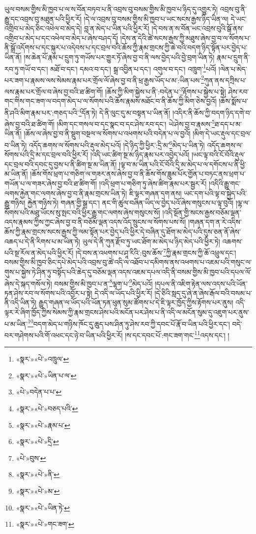 ཡུལ་བསམ་གྱིས་མི་ཁྱབ་པ་ལ་ས་བོན་བཏབ་པ་ནི་འབྲས་བུ་བསམ་གྱིས་མི་ཁྱབ་པ་ཉིད་དུ་འགྱུར་ཏེ། འབྲས་བུ་ནི་རྒྱུ་དང་འབྲས་བུ་མཐུན་པའི་ཕྱིར་རོ། །དེ་ལ་འབྲས་བུ་བསམ་གྱིས་མི་ཁྱབ་པ་ཡང་སངས་རྒྱས་ཉིད་ཡིན་ལ། དེ་ཡང་འགྲིབ་པ་མེད་ཅིང་འཕེལ་བ་མེད་དེ། བླ་ན་མེད་པ་ཡིན་པའི་ཕྱིར་རོ། །དེ་བས་ན་ས་བོན་ཡང་འབྲས་བུའི་སྒོ་ནས་འགྲིབ་པ་མེད་པ་དང་འཕེལ་བ་མེད་པ་ཞེས་བཤད་དོ། །དེས་ན་དེའི་ཚེ་སངས་རྒྱས་ཀྱི་མཐུས་ཞེས་བྱ་བ་ལ་སོགས་པ་ནི་སྒྲོ་འདོགས་པ་དང་སྐུར་པ་འདེབས་པ་དང་བྲལ་བའི་ཆོས་ཀྱི་རྣམ་གྲངས་ཀྱི་ཆེ་བའི་བདག་ཉིད་སྟོན་པར་བྱེད་པ་ཡིན་ནོ། །ས་ཆེན་པོ་རྣམ་པ་དྲུག་ཏུ་གཡོས་པར་གྱུར་ཏོ་ཞེས་བྱ་བ་ནི་ལས་བྱེད་པའི་བྱེ་བྲག་ཡིན་ཏེ། རྣམ་པ་དྲུག་ནི་རབ་ཏུ་གཡོ་བ་དང་། མཐོ་བ་དང་། དམའ་བ་དང་། སྒྲ་འབྱིན་པ་དང་། འགུལ་བ་དང་། འཁྲུག་\footnote{«སྣར་»«པེ་»འཁྲུལ་}པའོ། །ལེན་པ་མེད་པར་ཟག་པ་རྣམས་ལས་སེམས་རྣམ་པར་གྲོལ་ལོ་ཞེས་བྱ་བ་ནི་ཕྲ་རྒྱས་ཡོད་པ་མ་:ཡིན་པས་\footnote{«སྣར་»«པེ་»ཡིན་པ་ལ་}ཀུན་ནས་དཀྲིས་པ་ལས་རྣམ་པར་གྲོལ་བ་ཞེས་བྱ་བའི་ཐ་ཚིག་གོ། །ཆོས་ཀྱི་མིག་སྐྱེས་པ་ནི་:བདེན་པ་\footnote{«པེ་»བདེན་པ་པ་}རྟོགས་པ་སྐྱེས་པ་སྟེ། ཤེས་རབ་གང་གིས་གང་ཟག་ལ་བདག་མེད་པ་ལ་སོགས་པའི་ཆོས་རྣམས་མཐོང་བ་ནི་ཆོས་ཀྱི་མིག་ཅེས་བྱའོ། །ཆོས་སྨོས་པ་ནི་ཤའི་མིག་རྣམ་པར་:གཅད་པའི་\footnote{«སྣར་»«པེ་»བཅད་པའི་}དོན་ཏེ། དེ་ནི་ལུང་དུ་མ་བསྟན་པ་ཡིན་ནོ། །འདིར་ནི་ཆོས་ཀྱི་བདག་ཉིད་དགེ་བ་ཞེས་བྱ་བའི་ཐ་ཚིག་གོ། །མིག་དང་གསལ་བ་དང་སྣང་བ་དང་ཤེས་རབ་དང་། ཡེ་ཤེས་བྱ་བ་རྣམས་\footnote{«སྣར་»«པེ་»རྣམ་པ་}ཐ་དད་པ་མ་ཡིན་ནོ། །ཆོས་ལ་ཞེས་བྱ་བ་ནི་སྡུག་བསྔལ་ལ་སོགས་པ་འཕགས་པའི་བདེན་པ་ལ་བྱའོ། །མིག་དེ་ཡང་རྡུལ་དང་བྲལ་བ་ཡིན་ཏེ། འདོད་ཆགས་ལ་སོགས་པའི་རྡུལ་མེད་པའོ། །དེ་ཉིད་ཀྱི་ཕྱིར་:དྲི་མ་\footnote{«སྣར་»«པེ་»དྲི་}མེད་པ་ཡིན་ཏེ། འདོད་ཆགས་ལ་སོགས་པའི་དྲི་མ་དང་བྲལ་བའི་ཕྱིར་རོ། །འདི་ཡང་ཚིག་སྔ་མ་ཉིད་རྣམ་པར་འབྱེད་པའོ། །ཡང་ལྟ་བའི་ངོ་བོའི་རྡུལ་དང་བྲལ་བའི་དབང་དུ་བྱས་པ་ནི་ཚིག་སྔ་མ་ཡིན་ནོ། །ལྟ་བ་མ་ཡིན་པའི་ངོ་བོའི་དྲི་མ་མེད་པ་ལ་དགོངས་པ་ནི་ཕྱི་མ་ཡིན་ནོ། །ཆོས་གོས་ཕྲག་པ་གཅིག་ལ་གཟར་ནས་ཞེས་བྱ་བ་ནི་ཆོས་གོས་ཟླུམ་པོར་གྱོན་པ་བཏང་ནས་ཕྲག་པ་གཡོན་པ་ལ་གཟར་ཞེས་བྱ་བའི་ཐ་ཚིག་གོ། །འདི་ཕྲག་པ་གཅིག་ཏུ་ཞེས་ཚིག་རྣམ་པར་སྦྱར་རོ། །འདིའི་རྒྱུ་གང་ལགས་རྐྱེན་གང་ལགས་ཞེས་བྱ་བ་ནི་རྣམ་གྲངས་ཡིན་ཏེ། ཇི་ལྟར་གཞན་དག་ནས། ཡང་དག་པའི་ལྟ་བ་སྐྱེད་པའི་རྒྱུ་གཉིས། རྐྱེན་གཉིས་ཏེ། གཞན་གྱི་སྒྲ་དང་། ནང་གི་ཚུལ་བཞིན་ཡིད་ལ་བྱེད་པའོ་ཞེས་གསུངས་པ་ལྟ་བུའོ། །ལྷ་ལ་སོགས་པའི་མཐུ་ཡོངས་སུ་སྤང་བའི་ཕྱིར་རྒྱུ་གང་ལགས་ཞེས་གསུངས་སོ། །འདི་སྔོན་གྱི་སངས་རྒྱས་བཅོམ་ལྡན་འདས་རྣམས་ཀྱིས་ཀྱང་ཞེས་བྱ་བ་ནི་བཅོམ་ལྡན་འདས་འོད་སྲུངས་ལ་སོགས་པས་སོ། །གཞན་དག་ན་རེ་འདིས་ཆོས་ཀྱི་རྣམ་གྲངས་སངས་རྒྱས་ཀྱི་ལམ་སྟོན་པར་བྱེད་པའི་ཕྱིར་དེ་བཞིན་དུ་ཐོག་མ་མེད་པའི་དུས་ཅན་ནོ་ཞེས་འཆད་པ་དེ་ནི་རིགས་པ་མ་ཡིན་ཏེ། ཡུལ་དེ་ནི་ཀུན་རྫོབ་ཏུ་ཡང་ཐོག་མ་མེད་པ་ཉིད་མེད་པའི་ཕྱིར་ཏེ། འཆགས་པའི་སྔ་རོལ་ན་མེད་པའི་ཕྱིར་རོ། །དེ་བས་ན་འཕགས་པ་ཤཱ་རིའི་:བུས་ཆོས་\footnote{«པེ་»བུས་}ཀྱི་རྣམ་གྲངས་ཀྱི་ཆོ་འཕྲུལ་དང་། བསམ་གྱིས་མི་ཁྱབ་ཅིང་དཔེ་མེད་པའི་འབྲས་བུ་ཚེ་འདི་ལ་འཐོབ་པ་དམིགས་ནས་འཕགས་པ་འཇམ་པའི་གསུང་ལ་གུས་པ་སྐྱེས་ཏེ་ཤིན་ཏུ་བསྟོད་པའི་ཆེད་དུ་བཅོམ་ལྡན་འདས་འཇམ་དཔལ་འདི་ནི་བསམ་གྱིས་མི་ཁྱབ་པའི་དཔལ་ལོ་ཞེས་དེ་སྐད་གསོལ་ཏེ། བསམ་གྱིས་མི་ཁྱབ་པ་ན་\footnote{«སྣར་»«པེ་»ནི་}ལྷག་པ་\footnote{«སྣར་»«པེ་»མ་}མེད་པའོ། །དཔལ་ནི་འཇིག་རྟེན་ལས་འདས་པའི་ཡོན་ཏན་ཤེས་རབ་ལ་སོགས་པའི་འབྱོར་པ་སྟེ། དེ་འདི་ལ་ཡོད་པའི་ཕྱིར་རོ། །དེ་ཅིའི་སླད་དུ་ཞེ་ན་ཞེས་རྒོལ་བའི་བསམ་པ་ནི་འདི་ཡིན་ཏེ། རྒྱུད་གཞན་ལ་ཡོད་པའི་ཡོན་ཏན་ཕུན་སུམ་ཚོགས་པ་དེ་ཇི་ལྟར་ཁྱོད་ཀྱིས་རྟོགས་པར་ནུས། འདི་ལྟར་རེ་ཞིག་ཁྱོད་ཀྱིས་སེམས་ཀྱི་རྣམ་གྲངས་ཤེས་པའི་མངོན་པར་ཤེས་པ་ནི་འདི་ལ་མངོན་སུམ་དུ་འཇུག་པར་ནུས་པ་མ་ཡིན་\footnote{«སྣར་»«པེ་»ཡིན་ཏེ་}བདག་མེད་པ་གཉིས་ཁོང་དུ་ཆུད་པས་ཤིན་ཏུ་ཤེས་རབ་ཀྱི་དབང་པོ་རྣོ་བ་ཡིན་པའི་ཕྱིར་དང་། བདེ་བར་གཤེགས་པའི་གོ་འཕང་དང་ཉེ་བ་ཡིན་པའི་ཕྱིར་རོ། །ས་དང་དབང་པོ་:གང་ཟག་གང་\footnote{«སྣར་»«པེ་»གང་ཟག་}འདས་དང་། །
